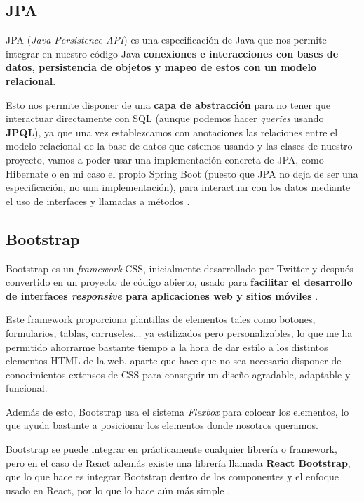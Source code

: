 \subsection{JPA}

JPA (\textit{Java Persistence API}) es una especificación de Java que nos permite integrar en nuestro código Java \textbf{conexiones e interacciones con bases de datos, persistencia de objetos y mapeo de estos con un modelo relacional}.

Esto nos permite disponer de una \textbf{capa de abstracción} para no tener que interactuar directamente con SQL (aunque podemos hacer \textit{queries} usando \textbf{JPQL}), ya que una vez establezcamos con anotaciones las relaciones entre el modelo relacional de la base de datos que estemos usando y las clases de nuestro proyecto, vamos a poder usar una implementación concreta de JPA, como  Hibernate o en mi caso el propio Spring Boot (puesto que JPA no deja de ser una especificación, no una implementación), para interactuar con los datos mediante el uso de interfaces y llamadas a métodos \cite{campusmvp:jpa}.


\subsection{Bootstrap}

Bootstrap es un \textit{framework} CSS, inicialmente desarrollado por Twitter y después convertido en un proyecto de código abierto, usado para \textbf{facilitar el desarrollo de interfaces \textit{responsive} para aplicaciones web y sitios móviles} \cite{w3schools:bootstrap}.

Este framework proporciona plantillas de elementos tales como botones, formularios, tablas, carruseles... ya estilizados pero personalizables, lo que me ha permitido ahorrarme bastante tiempo a la hora de dar estilo a los distintos elementos HTML de la web, aparte que hace que no sea necesario disponer de conocimientos extensos de CSS para conseguir un diseño agradable, adaptable y funcional.

Además de esto, Bootstrap usa el sistema \textit{Flexbox} para colocar los elementos, lo que ayuda bastante a posicionar los elementos donde nosotros queramos.

Bootstrap se puede integrar en prácticamente cualquier librería o framework, pero en el caso de React además existe una librería llamada \textbf{React Bootstrap}, que lo que hace es integrar Bootstrap dentro de los componentes y el enfoque usado en React, por lo que lo hace aún más simple \cite{react-bootstrap:main}.


